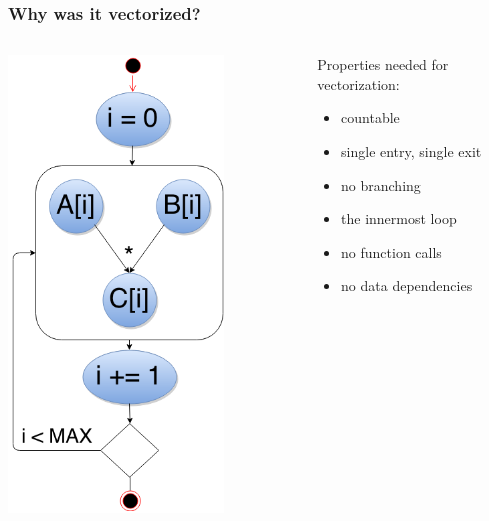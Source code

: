 \documentclass{beamer}
\begin{document}
\begin{frame}[fragile]
  \frametitle{Why was it vectorized?}
   \begin{columns}[onlytextwidth]
    \begin{column}{0.4\textwidth}
     \includegraphics[width=0.75\textwidth]{countable}
    \end{column}
    
    \begin{column}{0.6\textwidth}
      Properties needed for vectorization:
      \begin{itemize}
      \item countable
      \item single entry, single exit
      \item no branching
      \item the innermost loop
      \item no function calls
      \item no data dependencies
      \end{itemize}
    \end{column}
  \end{columns}  
  
\end{frame}
\end{document}
